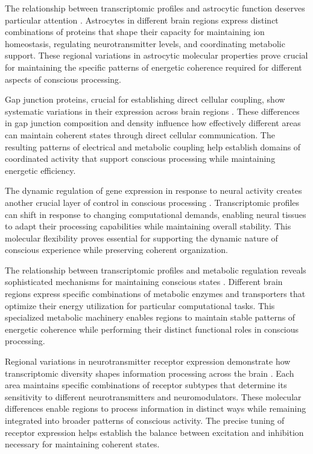 \begin{refsection}
The relationship between transcriptomic profiles and astrocytic function deserves particular attention \cite{Zhang2010}. Astrocytes in different brain regions express distinct combinations of proteins that shape their capacity for maintaining ion homeostasis, regulating neurotransmitter levels, and coordinating metabolic support. These regional variations in astrocytic molecular properties prove crucial for maintaining the specific patterns of energetic coherence required for different aspects of conscious processing.

Gap junction proteins, crucial for establishing direct cellular coupling, show systematic variations in their expression across brain regions \cite{Yuste2020}. These differences in gap junction composition and density influence how effectively different areas can maintain coherent states through direct cellular communication. The resulting patterns of electrical and metabolic coupling help establish domains of coordinated activity that support conscious processing while maintaining energetic efficiency.

The dynamic regulation of gene expression in response to neural activity creates another crucial layer of control in conscious processing \cite{Fishell2020}. Transcriptomic profiles can shift in response to changing computational demands, enabling neural tissues to adapt their processing capabilities while maintaining overall stability. This molecular flexibility proves essential for supporting the dynamic nature of conscious experience while preserving coherent organization.

The relationship between transcriptomic profiles and metabolic regulation reveals sophisticated mechanisms for maintaining conscious states \cite{Macosko2015}. Different brain regions express specific combinations of metabolic enzymes and transporters that optimize their energy utilization for particular computational tasks. This specialized metabolic machinery enables regions to maintain stable patterns of energetic coherence while performing their distinct functional roles in conscious processing.

Regional variations in neurotransmitter receptor expression demonstrate how transcriptomic diversity shapes information processing across the brain \cite{Saunders2018}. Each area maintains specific combinations of receptor subtypes that determine its sensitivity to different neurotransmitters and neuromodulators. These molecular differences enable regions to process information in distinct ways while remaining integrated into broader patterns of conscious activity. The precise tuning of receptor expression helps establish the balance between excitation and inhibition necessary for maintaining coherent states.


\end{refsection}

